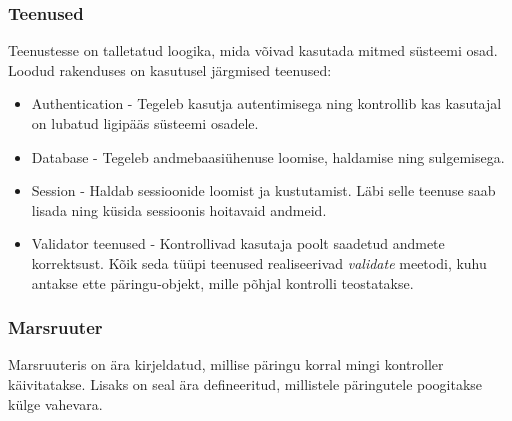 \documentclass[a4paper,12pt]{article} %
\begin{document}
\subsubsection{Teenused}
Teenustesse on talletatud loogika, mida võivad kasutada mitmed süsteemi osad. Loodud rakenduses on kasutusel järgmised teenused:
\begin{itemize}
\item Authentication - Tegeleb kasutja autentimisega ning kontrollib kas kasutajal on lubatud ligipääs süsteemi osadele.
\item Database - Tegeleb andmebaasiühenuse loomise, haldamise ning sulgemisega.
\item Session - Haldab sessioonide loomist ja kustutamist. Läbi selle teenuse saab lisada ning küsida sessioonis hoitavaid andmeid.
\item Validator teenused - Kontrollivad kasutaja poolt saadetud andmete korrektsust. Kõik seda tüüpi teenused realiseerivad \textit{validate} meetodi, kuhu antakse ette päringu-objekt, mille põhjal kontrolli teostatakse.
\end{itemize}

\subsubsection{Marsruuter}
Marsruuteris on ära kirjeldatud, millise päringu korral mingi kontroller käivitatakse. Lisaks on seal ära defineeritud, millistele päringutele poogitakse külge vahevara.
\end{document}
